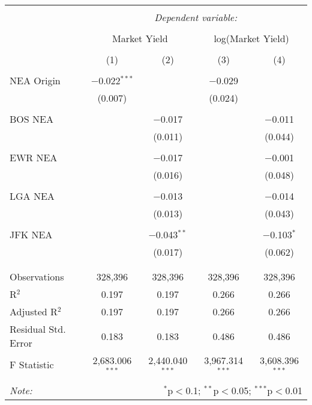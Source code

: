 
\begin{tabular}{@{\extracolsep{5pt}}lcccc} 
\\[-1.8ex]\hline 
\hline \\[-1.8ex] 
 & \multicolumn{4}{c}{\textit{Dependent variable:}} \\ 
\cline{2-5} 
\\[-1.8ex] & \multicolumn{2}{c}{Market Yield} & \multicolumn{2}{c}{log(Market Yield)} \\ 
\\[-1.8ex] & (1) & (2) & (3) & (4)\\ 
\hline \\[-1.8ex] 
 NEA Origin & $-$0.022$^{***}$ &  & $-$0.029 &  \\ 
  & (0.007) &  & (0.024) &  \\ 
  & & & & \\ 
 BOS NEA &  & $-$0.017 &  & $-$0.011 \\ 
  &  & (0.011) &  & (0.044) \\ 
  & & & & \\ 
 EWR NEA &  & $-$0.017 &  & $-$0.001 \\ 
  &  & (0.016) &  & (0.048) \\ 
  & & & & \\ 
 LGA NEA &  & $-$0.013 &  & $-$0.014 \\ 
  &  & (0.013) &  & (0.043) \\ 
  & & & & \\ 
 JFK NEA &  & $-$0.043$^{**}$ &  & $-$0.103$^{*}$ \\ 
  &  & (0.017) &  & (0.062) \\ 
  & & & & \\ 
\hline \\[-1.8ex] 
Observations & 328,396 & 328,396 & 328,396 & 328,396 \\ 
R$^{2}$ & 0.197 & 0.197 & 0.266 & 0.266 \\ 
Adjusted R$^{2}$ & 0.197 & 0.197 & 0.266 & 0.266 \\ 
Residual Std. Error & 0.183 & 0.183 & 0.486 & 0.486 \\ 
F Statistic & 2,683.006$^{***}$ & 2,440.040$^{***}$ & 3,967.314$^{***}$ & 3,608.396$^{***}$ \\ 
\hline 
\hline \\[-1.8ex] 
\textit{Note:}  & \multicolumn{4}{r}{$^{*}$p$<$0.1; $^{**}$p$<$0.05; $^{***}$p$<$0.01} \\ 
\end{tabular} 
